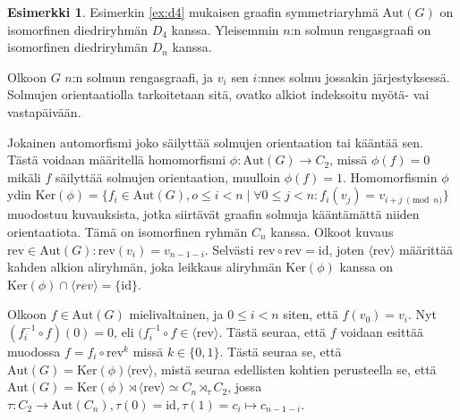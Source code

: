 \documentclass[a4paper, 12pt]{article}
\theoremstyle{definition}
\newtheorem{example}[mydef]{Esimerkki}
\theoremstyle{plain}
\begin{document}
\begin{example}
Esimerkin \ref{ex:d4} mukaisen graafin symmetriaryhmä $\mathrm{Aut}(G)$ on isomorfinen diedriryhmän $D_4$ kanssa. Yleisemmin $n$:n solmun rengasgraafi on isomorfinen diedriryhmän $D_n$ kanssa.

Olkoon $G$ $n$:n solmun rengasgraafi, ja $v_i$ sen $i$:nnes solmu jossakin järjes\-tyk\-sessä. Solmujen orientaatiolla tarkoitetaan sitä, ovatko alkiot indeksoitu myötä- vai vastapäivään.

Jokainen automorfismi joko säilyttää solmujen orientaation tai kääntää sen. Tästä voidaan määritellä homomorfismi $\phi: \mathrm{Aut}(G) \rightarrow C_2$, missä $\phi(f) = 0$ mikäli $f$ säilyttää solmujen orientaation, muulloin $\phi(f) = 1$. Homomorfismin $\phi$ ydin $\mathrm{Ker}(\phi) = \{f_i \in \mathrm{Aut}(G), o \leq i < n\;|\;\forall 0 \leq j < n: f_i(v_j) = v_{i + j\; \pmod{ n}}\}$ muodostuu kuvauksista, jotka siirtävät graafin solmuja kään\-tämät\-tä niiden orientaatiota. Tämä on isomorfinen ryhmän $C_n$ kanssa. Olkoot kuvaus $\mathrm{rev} \in \mathrm{Aut}(G):  \mathrm{rev}(v_i) = v_{n - 1 - i}$. Selvästi $\mathrm{rev} \circ \mathrm{rev} = \mathrm{id}$, joten $\langle \mathrm{rev} \rangle$ määrittää kahden alkion aliryhmän, joka leikkaus aliryhmän $\mathrm{Ker}(\phi)$ kanssa on $\mathrm{Ker}(\phi) \cap \langle rev \rangle = \{ \mathrm{id} \}$.

Olkoon $f \in \mathrm{Aut}(G)$ mielivaltainen, ja $0 \leq i < n$ siten, että $f(v_0) = v_i$. Nyt $(f_i^{-1} \circ f)(0) = 0$, eli $(f_i^{-1} \circ f \in \langle \mathrm{rev} \rangle$. Tästä seuraa, että $f$ voidaan esittää muodossa $f = f_i \circ \mathrm{rev}^k$ missä $k \in \{0, 1\}$. Tästä seuraa se, että $\mathrm{Aut}(G) = \mathrm{Ker}(\phi) \langle \mathrm{rev} \rangle$, mistä seuraa edellisten kohtien perusteella se, että $\mathrm{Aut}(G) = \mathrm{Ker}(\phi) \rtimes \langle \mathrm{rev} \rangle \simeq C_n \rtimes_\tau C_2$, jossa $\tau: C_2 \rightarrow \mathrm{Aut}(C_n), \tau(0) = \mathrm{id}, \tau(1) = c_i \mapsto c_{n - 1 - i}$.
\end{example}
\end{document}
